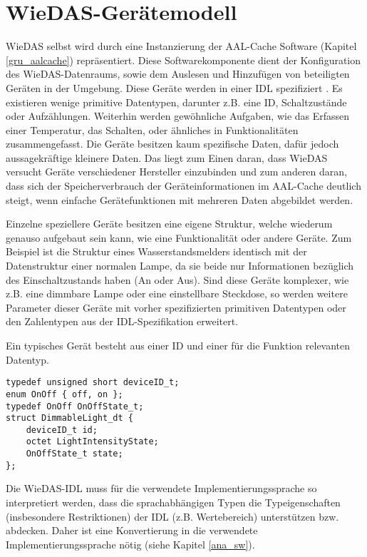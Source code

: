 \section{WieDAS-Gerätemodell}
\label{ana_wd_modell}

WieDAS selbst wird durch eine Instanzierung der AAL-Cache Software (Kapitel \ref{gru_aalcache})
repräsentiert.
Diese Softwarekomponente dient der Konfiguration des WieDAS-Datenraums, sowie dem Auslesen und
Hinzufügen von beteiligten Geräten in der Umgebung.
Diese Geräte werden in einer IDL \cite{idl} spezifiziert \cite{wiedas_idl}.
Es existieren wenige primitive Datentypen, darunter z.B. eine ID, Schaltzustände oder Aufzählungen.
Weiterhin werden gewöhnliche Aufgaben, wie das Erfassen einer Temperatur, das Schalten, oder ähnliches
in Funktionalitäten zusammengefasst.
Die Geräte besitzen kaum spezifische Daten, dafür jedoch aussagekräftige kleinere Daten.
Das liegt zum Einen daran, dass WieDAS versucht Geräte verschiedener Hersteller einzubinden und zum
anderen daran, dass sich der Speicherverbrauch der Geräteinformationen im AAL-Cache deutlich steigt,
wenn einfache Gerätefunktionen mit mehreren Daten abgebildet werden.

Einzelne speziellere Geräte besitzen eine eigene Struktur, welche wiederum genauso aufgebaut sein
kann, wie eine Funktionalität oder andere Geräte.
Zum Beispiel ist die Struktur eines Wasserstandsmelders identisch mit der Datenstruktur einer
normalen Lampe, da sie beide nur Informationen bezüglich des Einschaltzustands haben (An oder Aus).
Sind diese Geräte komplexer, wie z.B. eine dimmbare Lampe oder eine einstellbare Steckdose, so werden
weitere Parameter dieser Geräte mit vorher spezifizierten primitiven Datentypen oder den
Zahlentypen aus der IDL-Spezifikation erweitert.

\begin{absolutelynopagebreak}
Ein typisches Gerät besteht aus einer ID und einer für die Funktion relevanten Datentyp.

\lstset{language=IDL}
\begin{lstlisting}[frame=single,caption={Gerätebeschreibung eines dimmbaren Lichts in WieDAS}]
typedef unsigned short deviceID_t;
enum OnOff { off, on };
typedef OnOff OnOffState_t;
struct DimmableLight_dt {
	deviceID_t id;
	octet LightIntensityState;
	OnOffState_t state;
};
\end{lstlisting}
\end{absolutelynopagebreak}

Die WieDAS-IDL muss für die verwendete Implementierungssprache so interpretiert werden, dass die
sprachabhängigen Typen die Typeigenschaften (insbesondere Restriktionen) der IDL (z.B. Wertebereich)
unterstützen bzw. abdecken.
Daher ist eine Konvertierung in die verwendete Implementierungssprache nötig (siehe Kapitel \ref{ana_sw}).

